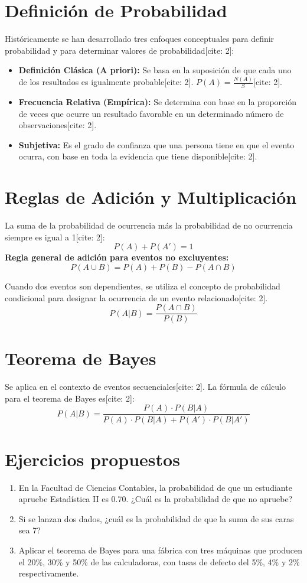 \documentclass[12pt,a4paper]{book}
\begin{document}
\section{Definición de Probabilidad}
Históricamente se han desarrollado tres enfoques conceptuales para definir probabilidad y para determinar valores de probabilidad[cite: 2]:
\begin{itemize}
    \item \textbf{Definición Clásica (A priori):} Se basa en la suposición de que cada uno de los resultados es igualmente probable[cite: 2]. $P(A) = \frac{N(A)}{S}$[cite: 2].
    \item \textbf{Frecuencia Relativa (Empírica):} Se determina con base en la proporción de veces que ocurre un resultado favorable en un determinado número de observaciones[cite: 2].
    \item \textbf{Subjetiva:} Es el grado de confianza que una persona tiene en que el evento ocurra, con base en toda la evidencia que tiene disponible[cite: 2].
\end{itemize}

\section{Reglas de Adición y Multiplicación}
La suma de la probabilidad de ocurrencia más la probabilidad de no ocurrencia siempre es igual a 1[cite: 2]:
\[
P(A) + P(A') = 1
\]
\textbf{Regla general de adición para eventos no excluyentes:}
\[
P(A \cup B) = P(A) + P(B) - P(A \cap B)
\]

\begin{definicion}
Cuando dos eventos son dependientes, se utiliza el concepto de probabilidad condicional para designar la ocurrencia de un evento relacionado[cite: 2].
\[
P(A|B) = \frac{P(A \cap B)}{P(B)}
\]
\end{definicion}

\section{Teorema de Bayes}
Se aplica en el contexto de eventos secuenciales[cite: 2]. La fórmula de cálculo para el teorema de Bayes es[cite: 2]:
\[
P(A|B) = \frac{P(A) \cdot P(B|A)}{P(A) \cdot P(B|A) + P(A') \cdot P(B|A')}
\]

\section{Ejercicios propuestos}
\begin{enumerate}
    \item En la Facultad de Ciencias Contables, la probabilidad de que un estudiante apruebe Estadística II es 0.70. ¿Cuál es la probabilidad de que no apruebe?
    \item Si se lanzan dos dados, ¿cuál es la probabilidad de que la suma de sus caras sea 7?
    \item Aplicar el teorema de Bayes para una fábrica con tres máquinas que producen el 20\%, 30\% y 50\% de las calculadoras, con tasas de defecto del 5\%, 4\% y 2\% respectivamente.
\end{enumerate}
\end{document}
